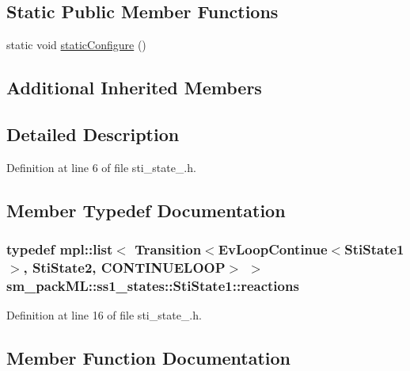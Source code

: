 \subsection*{Static Public Member Functions}
\begin{DoxyCompactItemize}
\item 
static void \hyperlink{structsm__packML_1_1ss1__states_1_1StiState1_a7bd6ff8fd8aaa582c83a6f59cab8d3af}{static\+Configure} ()
\end{DoxyCompactItemize}
\subsection*{Additional Inherited Members}


\subsection{Detailed Description}


Definition at line 6 of file sti\+\_\+state\+\_.\+h.



\subsection{Member Typedef Documentation}
\subsubsection[{\texorpdfstring{reactions}{reactions}}]{\setlength{\rightskip}{0pt plus 5cm}typedef mpl\+::list$<$ Transition$<$Ev\+Loop\+Continue$<${\bf Sti\+State1}$>$, {\bf Sti\+State2}, C\+O\+N\+T\+I\+N\+U\+E\+L\+O\+OP$>$ $>$ {\bf sm\+\_\+pack\+M\+L\+::ss1\+\_\+states\+::\+Sti\+State1\+::reactions}}\hypertarget{structsm__packML_1_1ss1__states_1_1StiState1_aba10fe558b600aa2aa77e046d6a35e66}{}\label{structsm__packML_1_1ss1__states_1_1StiState1_aba10fe558b600aa2aa77e046d6a35e66}


Definition at line 16 of file sti\+\_\+state\+\_.\+h.



\subsection{Member Function Documentation}

